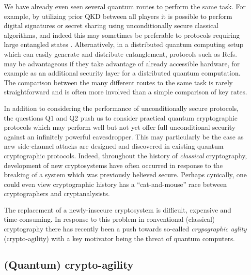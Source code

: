 We have already even seen several quantum routes to perform the same task. For example, by utilizing prior QKD between all players it is possible to perform digital signatures \cite{Wallden2015, Amiri2016a} or secret sharing \cite{Shamir1979, Blakley1979, Schneier1996} using unconditionally secure classical algorithms, and indeed this may sometimes be preferable to protocols requiring large entangled states \cite{Gottesman2001, Hillery1999}. Alternatively, in a distributed quantum computing setup which can easily generate and distribute entanglement, protocols such as Refs.~\cite{Bell2014, Kogias2017} may be advantageous if they take advantage of already accessible hardware, for example as an additional security layer for a distributed quantum computation. The comparison between the many different routes to the same task is rarely straightforward and is often more involved than a simple comparison of key rates.

In addition to considering the performance of unconditionally secure protocols, the questions Q1 and Q2 push us to consider practical quantum cryptographic protocols which may perform well but not yet offer full unconditional security against an infinitely powerful eavesdropper. This may particularly be the case as new side-channel attacks are designed and discovered in existing quantum cryptographic protocols. Indeed, throughout the history of \emph{classical} cryptography, development of new cryptosystems have often occurred in response to the breaking of a system which was previously believed secure. Perhaps cynically, one could even view cryptographic history has a ``cat-and-mouse'' race between cryptographers and cryptanalysists.%

The replacement of a newly-insecure cryptosystem is difficult, expensive and time-consuming. In response to this problem in conventional (classical) cryptography there has recently been a push towards so-called \emph{crypographic aglity} (crypto-agility) \cite{Sullivan2009, Chen2016} with a key motivator being the threat of quantum computers. %

\subsection{(Quantum) crypto-agility}

